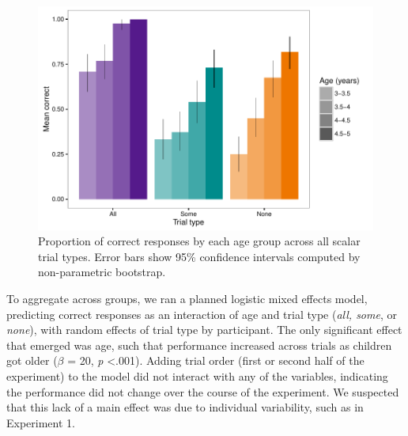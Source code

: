 \documentclass[man]{apa2}
\begin{document}

\begin{figure}
 \begin{center}
  \includegraphics[width=6in]{figures/exp2_performance.pdf}
  \caption{\label{fig:exp2_perf} Proportion of correct responses by each age group across all scalar trial types. Error bars show 95\% confidence intervals computed by non-parametric bootstrap.}
 \end{center}
\end{figure}

To aggregate across groups, we ran a planned logistic mixed effects model, predicting correct responses as an interaction of age and trial type (\textit{all, some}, or \textit{none}), with random effects of trial type by participant. The only significant effect that emerged was age, such that performance increased across trials as children got older ($\beta$ = 20, \textit{p} \textless  .001). Adding trial order (first or second half of the experiment) to the model did not interact with any of the variables, indicating the performance did not change over the course of the experiment. We suspected that this lack of a main effect was due to individual variability, such as in Experiment 1.
\end{document}
